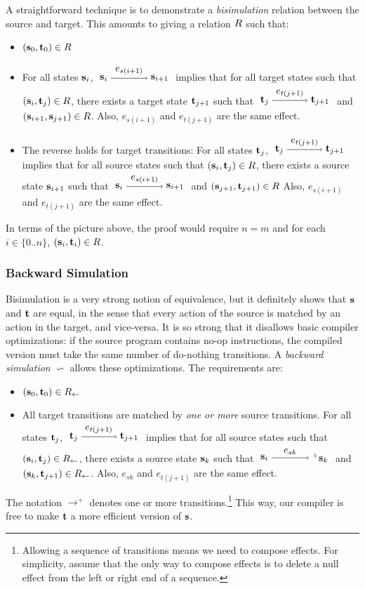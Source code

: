 A straightforward technique is to demonstrate a \emph{bisimulation} relation between the source and target.
This amounts to giving a relation $R$ such that:
\begin{itemize}
\item $(\mathbf{s}_0, \mathbf{t}_0) \in R$
\item For all states $\mathbf{s}_i$, $\stepsto{\srcprog_i}{\srcprog_{i+1}}{e_{s(i+1)}}$
      implies that for all target states such that $(\mathbf{s}_i, \mathbf{t}_j) \in R$, there exists a target state $\mathbf{t}_{j+1}$ such that $\stepsto{\tgtprog_j}{\tgtprog_{j+1}}{e_{t(j+1)}}$
      and $(\mathbf{s}_{i+1}, \mathbf{s}_{j+1}) \in R$.
      Also, $e_{s(i+1)}$ and $e_{t(j+1)}$ are the same effect.
\item The reverse holds for target transitions:
      For all states $\mathbf{t}_j$, $\stepsto{\tgtprog_j}{\tgtprog_{j+1}}{e_{t(j+1)}}$
      implies that for all source states such that $(\mathbf{s}_i, \mathbf{t}_j) \in R$,
      there exists a source state $\mathbf{s}_{i+1}$ such that $\stepsto{\srcprog_i}{\srcprog_{i+1}}{e_{s(i+1)}}$
      and $(\mathbf{s}_{j+1}, \mathbf{t}_{j+1}) \in R$
      Also, $e_{s(i+1)}$ and $e_{t(j+1)}$ are the same effect.
\end{itemize}

In terms of the picture above, the proof would require $n = m$ and for each $i \in \{0..n\}$, $(\mathbf{s}_i, \mathbf{t}_i) \in R$.


\subsubsection{Backward Simulation}
Bisimulation is a very strong notion of equivalence, but it definitely shows that $\mathbf{s}$ and $\mathbf{t}$ are equal, in the sense that every action of the source is matched by an action in the target, and vice-versa.
It is so strong that it disallows basic compiler optimizations: if the source program contains no-op instructions, the compiled version must take the same number of do-nothing transitions.
A \emph{backward simulation} $\backsim$ allows these optimizations.
The requirements are:
\begin{itemize}
\item $(\mathbf{s}_0, \mathbf{t}_0) \in {R_\leftarrow}$
\item All target transitions are matched by \emph{one or more} source transitions.
      For all states $\mathbf{t}_j$, $\stepsto{\tgtprog_j}{\tgtprog_{j+1}}{e_{t(j+1)}}$
      implies that for all source states such that $(\mathbf{s}_i, \mathbf{t}_j) \in {R_\leftarrow}$,
      there exists a source state $\mathbf{s}_{k}$ such that $\stepstoplus{\srcprog_i}{\srcprog_{k}}{e_{sk}}$
      and $(\mathbf{s}_k, \mathbf{t}_{j+1}) \in {R_\leftarrow}$.
      Also, $e_{sk}$ and $e_{t(j+1)}$ are the same effect.
\end{itemize}
The notation $\longrightarrow^+$ denotes one or more transitions.\footnote{Allowing a sequence of transitions means we need to compose effects. For simplicity, assume that the only way to compose effects is to delete a null effect from the left or right end of a sequence.}
This way, our compiler is free to make $\mathbf{t}$ a more efficient version of $\mathbf{s}$.


